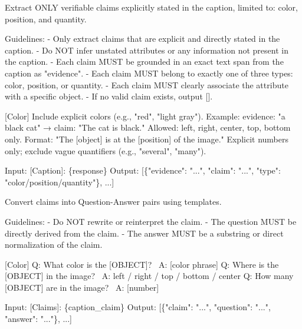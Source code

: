 
\begin{tcolorbox}[promptbox={\textsc{ClaimExtract}: Extract verifiable claims from caption}]
Extract ONLY verifiable claims explicitly stated in the caption, limited to: color, position, and quantity.

Guidelines:
- Only extract claims that are explicit and directly stated in the caption.
- Do NOT infer unstated attributes or any information not present in the caption.
- Each claim MUST be grounded in an exact text span from the caption as "evidence".
- Each claim MUST belong to exactly one of three types: color, position, or quantity.
- Each claim MUST clearly associate the attribute with a specific object.
- If no valid claim exists, output [].

[Color] Include explicit colors (e.g., "red", "light gray"). Example: evidence: "a black cat" → claim: "The cat is black." \newline
[Position] Allowed: left, right, center, top, bottom only. Format: "The [object] is at the [position] of the image." \newline
[Quantity] Explicit numbers only; exclude vague quantifiers (e.g., "several", "many").

\medskip
Input: [Caption]: \{response\} \newline
Output: [\{"evidence": "...", "claim": "...", "type": "color/position/quantity"\}, ...]
\end{tcolorbox}

\begin{tcolorbox}[promptbox={\textsc{ClaimToQA}: Convert claims into question–answer pairs}]
Convert claims into Question-Answer pairs using templates.

Guidelines:
- Do NOT rewrite or reinterpret the claim.
- The question MUST be directly derived from the claim.
- The answer MUST be a substring or direct normalization of the claim.

[Color] Q: What color is the [OBJECT]? \ A: [color phrase] \newline
[Position] Q: Where is the [OBJECT] in the image? \ A: left / right / top / bottom / center \newline
[Quantity] Q: How many [OBJECT] are in the image? \ A: [number]

\medskip
Input: [Claims]: \{caption\_claim\} \newline
Output: [\{"claim": "...", "question": "...", "answer": "..."\}, ...]
\end{tcolorbox}

